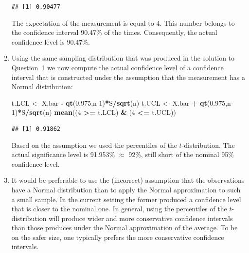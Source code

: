 \documentclass[
]{krantz}
\makeatletter
\newenvironment{Shaded}{\begin{snugshade}}{\end{snugshade}}
\newcommand{\DecValTok}[1]{\textcolor[rgb]{0.00,0.00,0.81}{#1}}
\newcommand{\FloatTok}[1]{\textcolor[rgb]{0.00,0.00,0.81}{#1}}
\newcommand{\KeywordTok}[1]{\textcolor[rgb]{0.13,0.29,0.53}{\textbf{#1}}}
\newcommand{\NormalTok}[1]{#1}
\newcommand{\OperatorTok}[1]{\textcolor[rgb]{0.81,0.36,0.00}{\textbf{#1}}}
\newcommand{\StringTok}[1]{\textcolor[rgb]{0.31,0.60,0.02}{#1}}
\newenvironment{kframe}{%
\medskip{}
\setlength{\fboxsep}{.8em}
 \def\at@end@of@kframe{}%
 \ifinner\ifhmode%
  \def\at@end@of@kframe{\end{minipage}}%
  \begin{minipage}{\columnwidth}%
 \fi\fi%
 \def\FrameCommand##1{\hskip\@totalleftmargin \hskip-\fboxsep
 \colorbox{shadecolor}{##1}\hskip-\fboxsep
     \hskip-\linewidth \hskip-\@totalleftmargin \hskip\columnwidth}%
 \MakeFramed {\advance\hsize-\width
   \@totalleftmargin\z@ \linewidth\hsize
   \@setminipage}}%
 {\par\unskip\endMakeFramed%
 \at@end@of@kframe}
\renewenvironment{Shaded}{\begin{kframe}}{\end{kframe}}
\theoremstyle{definition}
\theoremstyle{definition}
\theoremstyle{definition}
\theoremstyle{remark}
\makeatother
\begin{document}
\begin{enumerate}
\begin{verbatim}
## [1] 0.90477
\end{verbatim}

  The expectation of the measurement is equal to 4. This number belongs to
  the confidence interval 90.47\% of the times. Consequently, the actual
  confidence level is 90.47\%.
\item
  Using the same sampling
  distribution that was produced in the solution to Question~1 we now
  compute the actual confidence level of a confidence interval that is
  constructed under the assumption that the measurement has a Normal
  distribution:

\begin{Shaded}
\begin{Highlighting}[]
\NormalTok{t.LCL <-}\StringTok{ }\NormalTok{X.bar }\OperatorTok{-}\StringTok{ }\KeywordTok{qt}\NormalTok{(}\FloatTok{0.975}\NormalTok{,n}\DecValTok{-1}\NormalTok{)}\OperatorTok{*}\NormalTok{S}\OperatorTok{/}\KeywordTok{sqrt}\NormalTok{(n)}
\NormalTok{t.UCL <-}\StringTok{ }\NormalTok{X.bar }\OperatorTok{+}\StringTok{ }\KeywordTok{qt}\NormalTok{(}\FloatTok{0.975}\NormalTok{,n}\DecValTok{-1}\NormalTok{)}\OperatorTok{*}\NormalTok{S}\OperatorTok{/}\KeywordTok{sqrt}\NormalTok{(n)}
\KeywordTok{mean}\NormalTok{((}\DecValTok{4} \OperatorTok{>=}\StringTok{ }\NormalTok{t.LCL) }\OperatorTok{&}\StringTok{ }\NormalTok{(}\DecValTok{4} \OperatorTok{<=}\StringTok{ }\NormalTok{t.UCL))}
\end{Highlighting}
\end{Shaded}

\begin{verbatim}
## [1] 0.91862
\end{verbatim}

  Based on the assumption we used the percentiles of the \(t\)-distribution.
  The actual significance level is 91.953\% \(\approx\) 92\%, still short of
  the nominal 95\% confidence level.
\item
  It would be preferable to use the
  (incorrect) assumption that the observations have a Normal distribution
  than to apply the Normal approximation to such a small sample. In the
  current setting the former produced a confidence level that is closer to
  the nominal one. In general, using the percentiles of the
  \(t\)-distribution will produce wider and more conservative confidence
  intervals than those produces under the Normal approximation of the
  average. To be on the safer size, one typically prefers the more
  conservative confidence intervals.
\end{enumerate}
\end{document}
